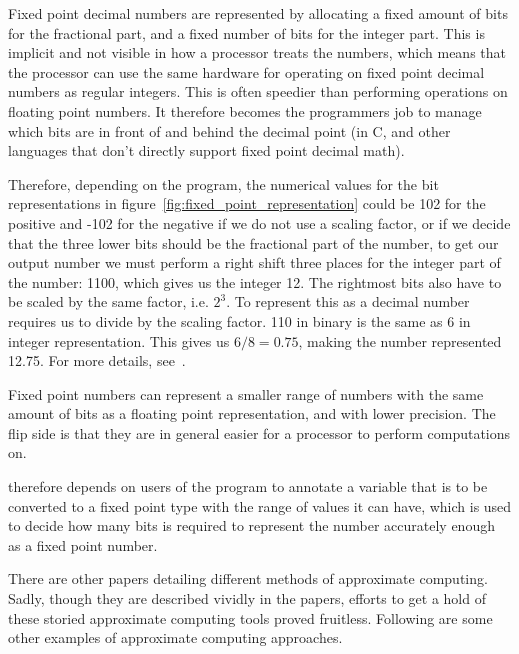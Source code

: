 Fixed point decimal numbers are represented by allocating a fixed amount of bits for the fractional part, and a fixed number of bits for the integer part. This is implicit and not visible in how a processor treats the numbers, which means that the processor can use the same hardware for operating on fixed point decimal numbers as regular integers. This is often speedier than performing operations on floating point numbers. It therefore becomes the programmers job to manage which bits are in front of and behind the decimal point (in C, and other languages that don't directly support fixed point decimal math). 



Therefore, depending on the program, the numerical values for the bit representations in figure~\ref{fig:fixed_point_representation} could be 102 for the positive and -102 for the negative if we do not use a scaling factor, or if we decide that the three lower bits should be the fractional part of the number, to get our output number we must perform a right shift three places for the integer part of the number: 1100, which gives us the integer 12. The rightmost bits also have to be scaled by the same factor, i.e. $2^3$. To represent this as a decimal number requires us to divide by the scaling factor. 110 in binary is the same as 6 in integer representation. This gives us $6/8 = 0.75$, making the number represented 12.75. For more details, see~\citet{yates2009fixed}.


Fixed point numbers can represent a smaller range of numbers with the same amount of bits as a floating point representation, and with lower precision. The flip side is that they are in general easier for a processor to perform computations on. 

\taffo{} therefore depends on users of the program to annotate a variable that is to be converted to a fixed point type with the range of values it can have, which is used to decide how many bits is required to represent the number accurately enough as a fixed point number. 


There are other papers detailing different methods of approximate computing. Sadly, though they are described vividly in the papers, efforts to get a hold of these storied approximate computing tools proved fruitless. Following are some other examples of approximate computing approaches.

